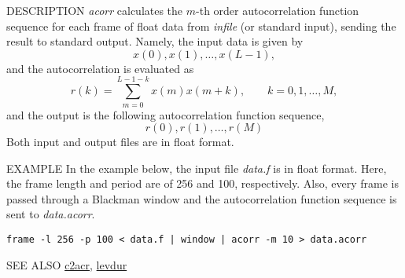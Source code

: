 \begin{synopsis}
 \item[ acorr ] [ --m $M$ ] [ --l $L$ ] [ {\em infile} ]
\end{synopsis}

\begin{qsection}{DESCRIPTION}
{\em acorr} calculates the $m$-th order autocorrelation function sequence 
for each frame of float data from {\em infile} (or standard input), 
sending the result to standard output.
Namely, the input data is given by
\[ x(0),x(1),\dots,x(L-1), \]
 and the autocorrelation is evaluated as
\[ r(k)=\sum_{m=0}^{L-1-k}x(m)x(m+k), \qquad k=0,1,\dots,M, \]
 and the output is the following autocorrelation function sequence,
\[ r(0),r(1),\dots,r(M) \]
 Both input and output files are in float format.
\end{qsection}

\begin{options}
\end{options}

\begin{qsection}{EXAMPLE}
In the example below, the input file {\em data.f} is in float format.
Here, the frame length and period are of 256 and 100, respectively.
Also, every frame is passed through a Blackman window and the
autocorrelation function sequence is sent to {\em data.acorr}.
\begin{center}
 \verb!frame -l 256 -p 100 < data.f | window | acorr -m 10 > data.acorr!
\end{center}
\end{qsection}

\begin{qsection}{SEE ALSO}
\hyperlink{c2acr}{c2acr}, 
\hyperlink{levdur}{levdur}
\end{qsection}
